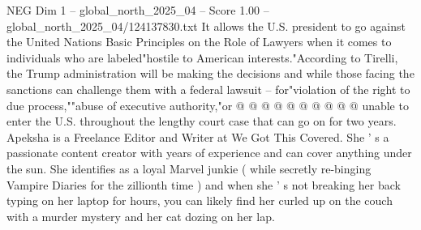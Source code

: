 \begin{textsample}{NEG Dim 1 – global\_north\_2025\_04 – Score 1.00 – global\_north\_2025\_04/124137830.txt}
It allows the U.S. president to go against the United Nations Basic Principles on the Role of Lawyers when it comes to individuals who are labeled"hostile to American interests."According to Tirelli, the Trump administration will be making the decisions and while those facing the sanctions can challenge them with a federal lawsuit -- for"violation of the right to due process,""abuse of executive authority,"or @ @ @ @ @ @ @ @ @ @ unable to enter the U.S. throughout the lengthy court case that can go on for two years.
Apeksha is a Freelance Editor and Writer at We Got This Covered.
She ' s a passionate content creator with years of experience and can cover anything under the sun.
She identifies as a loyal Marvel junkie ( while secretly re-binging Vampire Diaries for the zillionth time ) and when she ' s not breaking her back typing on her laptop for hours, you can likely find her curled up on the couch with a murder mystery and her cat dozing on her lap.

\end{textsample}
